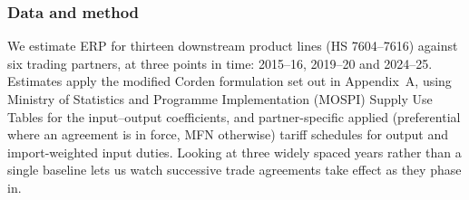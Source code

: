 \documentclass[11pt, a4paper]{article}
\numberwithin{figure}{section}
\numberwithin{table}{section}
\begin{document}
\subsubsection*{Data and method}
We estimate ERP for thirteen downstream product lines (HS 7604--7616) against six trading partners, at three points in time: 2015--16, 2019--20 and 2024--25. Estimates apply the modified Corden formulation set out in Appendix~A, using Ministry of Statistics and Programme Implementation (MOSPI) Supply Use Tables for the input--output coefficients, and partner-specific applied (preferential where an agreement is in force, MFN otherwise) tariff schedules for output and import-weighted input duties. Looking at three widely spaced years rather than a single baseline lets us watch successive trade agreements take effect as they phase in.
\end{document}
